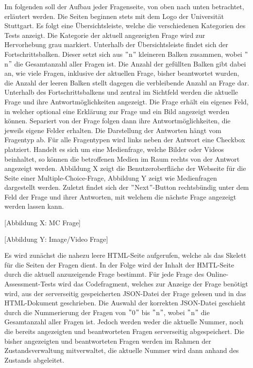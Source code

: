 Im folgenden soll der Aufbau jeder Fragenseite, von oben nach unten betrachtet, erläutert werden. Die Seiten beginnen stets mit dem Logo der Universität Stuttgart. Es folgt eine Übersichtsleiste, welche die verschiedenen Kategorien des Tests anzeigt. Die Kategorie der aktuell angezeigten Frage wird zur Hervorhebung grau markiert. Unterhalb der Übersichtsleiste findet sich der Fortschrittsbalken. Dieser setzt sich aus $"$n$"$ kleineren Balken zusammen, wobei $"$n$"$ die Gesamtanzahl aller Fragen ist. Die Anzahl der gefüllten Balken gibt dabei an, wie viele Fragen, inklusive der aktuellen Frage, bisher beantwortet wurden, die Anzahl der leeren Balken stellt dagegen die verbleibende Anzahl an Frage dar. Unterhalb des Fortschrittsbalkens und zentral im Sichtfeld werden die aktuelle Frage und ihre Antwortmöglichkeiten angezeigt. Die Frage erhält ein eigenes Feld, in welcher optional eine Erklärung zur Frage und ein Bild angezeigt werden können. Separiert von der Frage folgen dann ihre Antwortmöglichkeiten, die jeweils eigene Felder erhalten. Die Darstellung der Antworten hängt vom Fragentyp ab. Für alle Fragentypen wird links neben der Antwort eine Checkbox platziert. Handelt es sich um eine Medienfrage, welche Bilder oder Videos beinhaltet, so können die betroffenen Medien im Raum rechts von der Antwort angezeigt werden. Abbildung X zeigt die Benutzeroberfläche der Webseite für die Seite einer Multiple-Choice-Frage, Abbildung Y zeigt wie Medienfragen dargestellt werden. Zuletzt findet sich der $"$Next$"$-Button rechtsbündig unter dem Feld der Frage und ihrer Antworten, mit welchem die nächste Frage angezeigt werden lassen kann.

[Abbildung X: MC Frage]

[Abbildung Y: Image/Video Frage]

Es wird zunächst die nahezu leere HTML-Seite aufgerufen, welche als das Skelett für die Seiten der Fragen dient. In der Folge wird der Inhalt der HMTL-Seite durch die aktuell anzuzeigende Frage bestimmt. Für jede Frage des Online-Assessment-Tests wird das Codefragment, welches zur Anzeige der Frage benötigt wird, aus der serverseitig gespeicherten JSON-Datei der Frage gelesen und in das HTML-Dokument geschrieben. Die Auswahl der korrekten JSON-Datei geschieht durch die Nummerierung der Fragen von $"$0$"$ bis $"$n$"$, wobei $"$n$"$ die Gesamtanzahl aller Fragen ist. Jedoch werden weder die aktuelle Nummer, noch die bereits angezeigten und beantworteten Fragen serverseitig abgespeichert. Die bisher angezeigten und beantworteten Fragen werden im Rahmen der Zustandsverwaltung mitverwaltet, die aktuelle Nummer wird dann anhand des Zustands abgeleitet.

